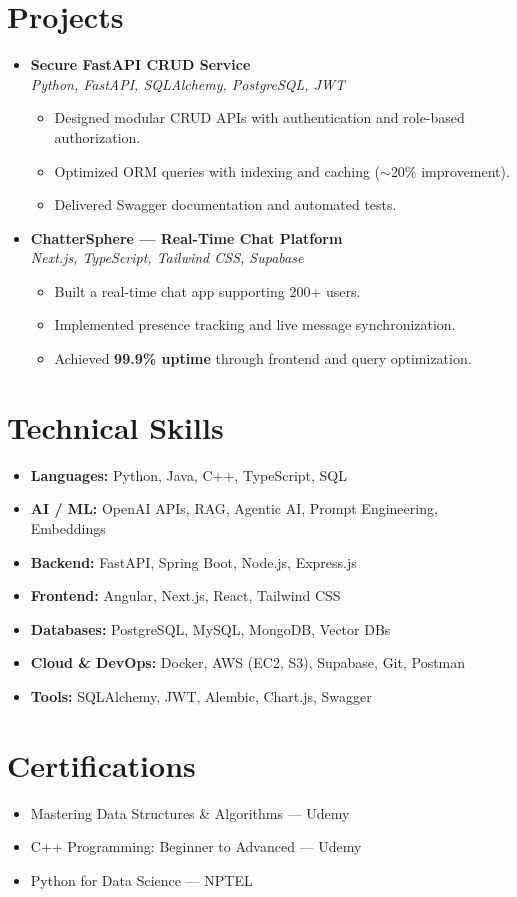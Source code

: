 \documentclass[a4paper,11pt]{article}
\begin{document}
\section{Projects}
\begin{itemize}
    \item \textbf{Secure FastAPI CRUD Service} \\
    \textit{Python, FastAPI, SQLAlchemy, PostgreSQL, JWT}
    \begin{itemize}
        \item Designed modular CRUD APIs with authentication and role-based authorization.
        \item Optimized ORM queries with indexing and caching ($\sim$20\% improvement).
        \item Delivered Swagger documentation and automated tests.
    \end{itemize}

    \item \textbf{ChatterSphere --- Real-Time Chat Platform} \\
    \textit{Next.js, TypeScript, Tailwind CSS, Supabase}
    \begin{itemize}
        \item Built a real-time chat app supporting 200+ users.
        \item Implemented presence tracking and live message synchronization.
        \item Achieved \textbf{99.9\% uptime} through frontend and query optimization.
    \end{itemize}

\end{itemize}

\section{Technical Skills}
\begin{itemize}
    \item \textbf{Languages:} Python, Java, C++, TypeScript, SQL
    \item \textbf{AI / ML:} OpenAI APIs, RAG, Agentic AI, Prompt Engineering, Embeddings
    \item \textbf{Backend:} FastAPI, Spring Boot, Node.js, Express.js
    \item \textbf{Frontend:} Angular, Next.js, React, Tailwind CSS
    \item \textbf{Databases:} PostgreSQL, MySQL, MongoDB, Vector DBs
    \item \textbf{Cloud \& DevOps:}  Docker, AWS (EC2, S3), Supabase, Git, Postman
    \item \textbf{Tools:} SQLAlchemy, JWT, Alembic, Chart.js, Swagger
\end{itemize}

\section{Certifications}
\begin{itemize}
    \item Mastering Data Structures \& Algorithms --- Udemy
    \item C++ Programming: Beginner to Advanced --- Udemy
    \item Python for Data Science --- NPTEL
\end{itemize}
\end{document}
